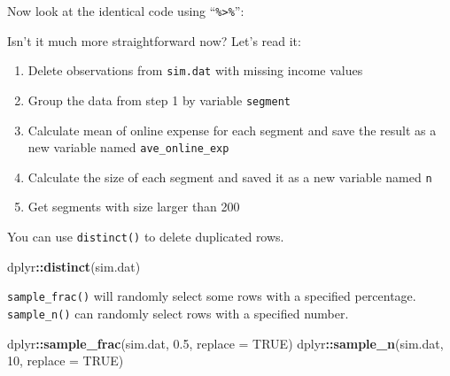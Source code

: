 \documentclass[12pt,]{krantz}
\makeatletter
\newenvironment{Shaded}{\begin{snugshade}}{\end{snugshade}}
\newcommand{\DataTypeTok}[1]{\textcolor[rgb]{0.27,0.27,0.27}{#1}}
\newcommand{\DecValTok}[1]{\textcolor[rgb]{0.06,0.06,0.06}{#1}}
\newcommand{\FloatTok}[1]{\textcolor[rgb]{0.06,0.06,0.06}{#1}}
\newcommand{\KeywordTok}[1]{\textcolor[rgb]{0.27,0.27,0.27}{\textbf{#1}}}
\newcommand{\NormalTok}[1]{#1}
\newcommand{\OperatorTok}[1]{\textcolor[rgb]{0.43,0.43,0.43}{\textbf{#1}}}
\newcommand{\OtherTok}[1]{\textcolor[rgb]{0.37,0.37,0.37}{#1}}
\newcommand{\StringTok}[1]{\textcolor[rgb]{0.5,0.5,0.5}{#1}}
\providecommand{\tightlist}{%
  \setlength{\itemsep}{0pt}\setlength{\parskip}{0pt}}
\newenvironment{kframe}{%
\medskip{}
\setlength{\fboxsep}{.8em}
 \def\at@end@of@kframe{}%
 \ifinner\ifhmode%
  \def\at@end@of@kframe{\end{minipage}}%
  \begin{minipage}{\columnwidth}%
 \fi\fi%
 \def\FrameCommand##1{\hskip\@totalleftmargin \hskip-\fboxsep
 \colorbox{shadecolor}{##1}\hskip-\fboxsep
     \hskip-\linewidth \hskip-\@totalleftmargin \hskip\columnwidth}%
 \MakeFramed {\advance\hsize-\width
   \@totalleftmargin\z@ \linewidth\hsize
   \@setminipage}}%
 {\par\unskip\endMakeFramed%
 \at@end@of@kframe}
\renewenvironment{Shaded}{\begin{kframe}}{\end{kframe}}
\makeatother
\begin{document}
Now look at the identical code using ``\texttt{\%\textgreater{}\%}'':

\begin{Shaded}
\end{Shaded}

Isn't it much more straightforward now? Let's read it:

\begin{enumerate}
\def\labelenumi{\arabic{enumi}.}
\tightlist
\item
  Delete observations from \texttt{sim.dat} with missing income values
\item
  Group the data from step 1 by variable \texttt{segment}
\item
  Calculate mean of online expense for each segment and save the result as a new variable named \texttt{ave\_online\_exp}
\item
  Calculate the size of each segment and saved it as a new variable named \texttt{n}
\item
  Get segments with size larger than 200
\end{enumerate}

You can use \texttt{distinct()} to delete duplicated rows.

\begin{Shaded}
\begin{Highlighting}[]
\NormalTok{dplyr}\OperatorTok{::}\KeywordTok{distinct}\NormalTok{(sim.dat)}
\end{Highlighting}
\end{Shaded}

\texttt{sample\_frac()} will randomly select some rows with a specified percentage. \texttt{sample\_n()} can randomly select rows with a specified number.

\begin{Shaded}
\begin{Highlighting}[]
\NormalTok{dplyr}\OperatorTok{::}\KeywordTok{sample_frac}\NormalTok{(sim.dat, }\FloatTok{0.5}\NormalTok{, }\DataTypeTok{replace =} \OtherTok{TRUE}\NormalTok{) }
\NormalTok{dplyr}\OperatorTok{::}\KeywordTok{sample_n}\NormalTok{(sim.dat, }\DecValTok{10}\NormalTok{, }\DataTypeTok{replace =} \OtherTok{TRUE}\NormalTok{) }
\end{Highlighting}
\end{Shaded}
\end{document}
